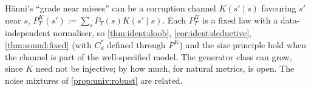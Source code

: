 \begin{remark}\identbrk{}\label{rem:ident:nearmiss}
H\"anni's ``grade near misses'' can be a corruption channel $K(s'\mid s)$ favouring $s'$ near $s$, $P^K_T(s'):=\sum_sP_T(s)K(s'\mid s)$. Each $P^K_T$ is a fixed law with a data-independent normaliser, so \cref{thm:ident:doob}, \cref{cor:ident:deductive}, \cref{thm:sound:fixed} (with $C^*_d$ defined through $P^K$) and the size principle hold when the channel is part of the well-specified model. The generator class can grow, since $K$ need not be injective; by how much, for natural metrics, is open. The noise mixtures of \cref{prop:univ:robust} are related.
\end{remark}
